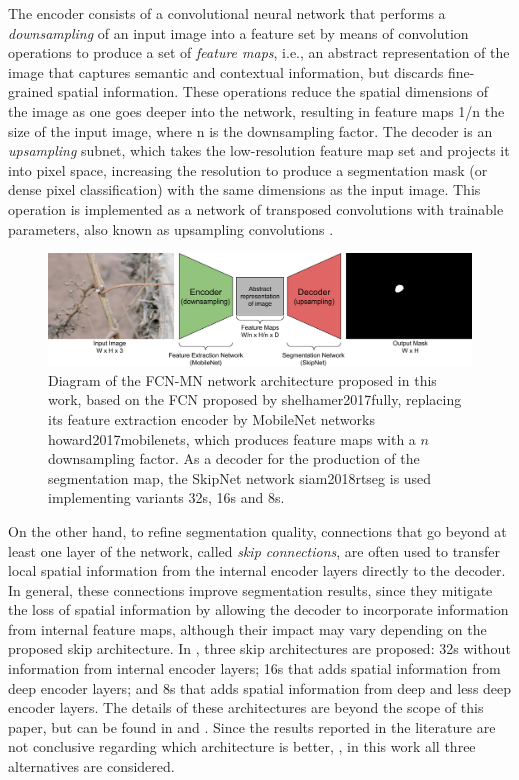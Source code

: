 \documentclass[a4paper,authoryear,review]{elsarticle}
\begin{document}
	The encoder consists of a convolutional neural network that performs a \emph{downsampling} of an input image into a feature set by means of convolution operations to produce a set of \emph{feature maps}, i.e., an abstract representation of the image that captures semantic and contextual information, but discards fine-grained spatial information. These operations reduce the spatial dimensions of the image as one goes deeper into the network, resulting in feature maps 1/n the size of the input image, where n is the downsampling factor. The decoder is an \emph{upsampling} subnet, which takes the low-resolution feature map set and projects it into pixel space, increasing the resolution to produce a segmentation mask (or dense pixel classification) with the same dimensions as the input image. This operation is implemented as a network of transposed convolutions with trainable parameters, also known as upsampling convolutions \citep{shelhamer2017fully}. 
	
	
	
	\begin{figure}
		\centering
		\includegraphics[width=12cm]{figures/Figure1.png}
		\caption{
			Diagram of the FCN-MN network architecture proposed in this work, based on the FCN proposed by {shelhamer2017fully}, replacing its feature extraction encoder by MobileNet networks {howard2017mobilenets}, which produces feature maps with a $n$ downsampling factor. As a decoder for the production of the segmentation map, the SkipNet network {siam2018rtseg} is used implementing variants 32s, 16s and 8s.
		}
		\label{fig:Figure1}
	\end{figure}
	
	On the other hand, to refine segmentation quality, connections that go beyond at least one layer of the network, called \emph{skip connections}, are often used to transfer local spatial information from the internal encoder layers directly to the decoder. In general, these connections improve segmentation results, since they mitigate the loss of spatial information by allowing the decoder to incorporate information from internal feature maps, although their impact may vary depending on the proposed skip architecture. In \citet{long2015fully}, three skip architectures are proposed: 32s without information from internal encoder layers; 16s that adds spatial information from deep encoder layers; and 8s that adds spatial information from deep and less deep encoder layers. The details of these architectures are beyond the scope of this paper, but can be found in \citet{long2015fully} and \citet{shelhamer2017fully}. Since the results reported in the literature are not conclusive regarding which architecture is better,  \citet{long2015fully, shelhamer2017fully}, in this work all three alternatives are considered.
	
\end{document}
